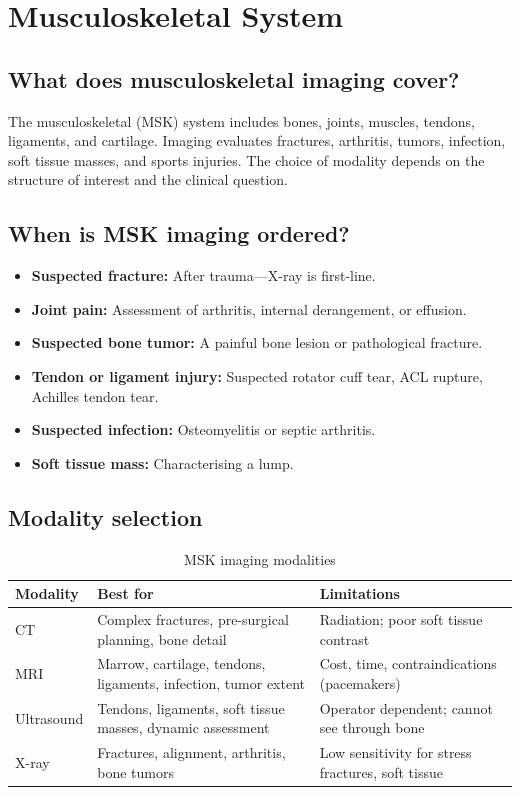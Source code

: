 \chapter{Musculoskeletal System}

\label{ch:ch54_musculoskeletal}

\section{What does musculoskeletal imaging cover?}
The musculoskeletal (MSK) system includes bones, joints, muscles, tendons, ligaments, and cartilage. Imaging evaluates fractures, arthritis, tumors, infection, soft tissue masses, and sports injuries. The choice of modality depends on the structure of interest and the clinical question.

\section{When is MSK imaging ordered?}
\begin{itemize}
    \item \textbf{Suspected fracture:} After trauma---X-ray is first-line.
    \item \textbf{Joint pain:} Assessment of arthritis, internal derangement, or effusion.
    \item \textbf{Suspected bone tumor:} A painful bone lesion or pathological fracture.
    \item \textbf{Tendon or ligament injury:} Suspected rotator cuff tear, ACL rupture, Achilles tendon tear.
    \item \textbf{Suspected infection:} Osteomyelitis or septic arthritis.
    \item \textbf{Soft tissue mass:} Characterising a lump.
\end{itemize}

\section{Modality selection}

\begin{table}[h]
\centering
\caption{MSK imaging modalities}
\label{tab:msk_modality}
\begin{tabular}{@{}p{}p{}p{}@{}}
\hline
\textbf{Modality} & \textbf{Best for} & \textbf{Limitations} \\
\hline
CT & Complex fractures, pre-surgical planning, bone detail & Radiation; poor soft tissue contrast \\
MRI & Marrow, cartilage, tendons, ligaments, infection, tumor extent & Cost, time, contraindications (pacemakers) \\
Ultrasound & Tendons, ligaments, soft tissue masses, dynamic assessment & Operator dependent; cannot see through bone \\
X-ray & Fractures, alignment, arthritis, bone tumors & Low sensitivity for stress fractures, soft tissue \\
\hline
\end{tabular}
\end{table}

